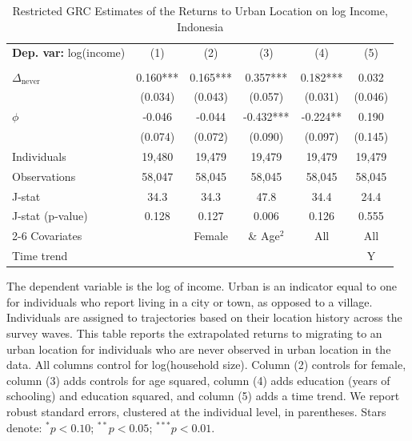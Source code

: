 \begin{table}[htbp] \centering \begin{threeparttable}
 \caption{Restricted GRC Estimates of the Returns to Urban Location on log Income, Indonesia} 
 \label{tab:GRC_IDN_income_urban_unb} 
\begin{tabular}{l ccccc} \toprule  \textbf{Dep. var:}  log(income) 
                    &\multicolumn{1}{c}{(1)}   &\multicolumn{1}{c}{(2)}   &\multicolumn{1}{c}{(3)}   &\multicolumn{1}{c}{(4)}   &\multicolumn{1}{c}{(5)}   \\
                    &               &               &               &               &               \\
\addlinespace
$\Delta_{\text{never}}$&    0.160***&       0.165***&       0.357***&       0.182***&       0.032   \\
                    &     (0.034)   &     (0.043)   &     (0.057)   &     (0.031)   &     (0.046)   \\
\addlinespace
$\phi$              &      -0.046   &      -0.044   &      -0.432***&      -0.224** &       0.190   \\
                    &     (0.074)   &     (0.072)   &     (0.090)   &     (0.097)   &     (0.145)   \\
\addlinespace
Individuals         &      19,480   &      19,479   &      19,479   &      19,479   &      19,479   \\
Observations        &      58,047   &      58,045   &      58,045   &      58,045   &      58,045   \\
J-stat              &        34.3   &        34.3   &        47.8   &        34.4   &        24.4   \\
J-stat (p-value)    &       0.128   &       0.127   &       0.006   &       0.126   &       0.555   \\
\cmidrule{2-6} Covariates & & Female & \& Age$^2$ & All & All  \\ Time trend & & & & & Y \\ \bottomrule \end{tabular} \begin{tablenotes} \footnotesize \item{The dependent variable is the log of income. Urban is an indicator equal to one for individuals who report living in a city or town, as opposed to a village. Individuals are assigned to trajectories based on their location history across the survey waves. This table reports the extrapolated returns to migrating to an urban location for individuals who are never observed in urban location in the data. 
All columns control for log(household size). Column (2) controls for female, column (3) adds controls for age squared, column (4) adds education (years of schooling) and education squared, and column (5) adds a time trend.  We report robust standard errors, clustered at the individual level, in parentheses. Stars denote: $^{*} p<0.10$; $^{**} p<0.05$; $^{***} p<0.01$.} \end{tablenotes} \end{threeparttable} \end{table}
